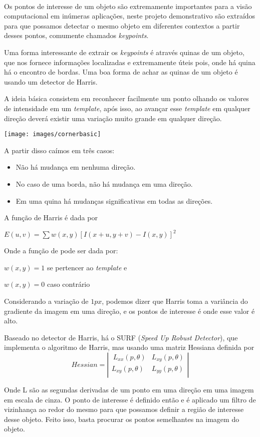 \documentclass[conference,harvard,brazil,english]{sbatex}
\begin{document}
	\paragraph{} Os pontos de interesse de um objeto são extremamente importantes para a visão computacional em inúmeras aplicações, neste projeto demonstrativo são extraídos para que possamos detectar o mesmo objeto em diferentes contextos a partir desses pontos, comumente chamados \textit{keypoints}.
	\par Uma forma interessante de extrair os \textit{keypoints} é através quinas de um objeto, que nos fornece informações localizadas e extremamente úteis pois, onde há quina há o encontro de bordas. Uma boa forma de achar as quinas de um objeto é usando um detector de Harris.
	\par A ideia básica consistem em reconhecer facilmente um ponto olhando os valores de intensidade em um \textit{template}, após isso, ao avançar esse \textit{template} em qualquer direção deverá existir uma variação muito grande em qualquer direção.\\
	\centerline{\texttt{[image: images/cornerbasic]}}
	\par A partir disso caímos em três casos: 
	\begin{itemize}
		\item[\Checkmark] Não há mudança em nenhuma direção.
		\item[\Checkmark] No caso de uma borda, não há mudança em uma direção.
		\item[\Checkmark] Em uma quina há mudanças significativas em todas as direções.
	\end{itemize}
	\par A função de Harris é dada por\\ 
	\par\centerline{$E(u,v) = \sum w(x,y)[I(x+u, y+v) - I(x,y)]^2$}
	Onde a função de pode ser dada por:\\
	\par
	\centerline{$w(x,y) = 1$  se pertencer ao \textit{template} e}
	\centerline{$w(x, y) = 0$ caso contrário}
	\par Considerando a variação de $1px$, podemos dizer que Harris toma a variância do gradiente da imagem em uma direção, e os pontos de interesse é onde esse valor é alto.
	\par Baseado no detector de Harris, há o SURF (\textit{Speed Up Robust Detector}), que implementa o algoritmo de Harris, mas usando uma matriz Hessiana definida por
	\[ Hessian = \left| \begin{array}{ccc}
	\ L_{xx}(p, \theta) & L_{xy}(p, \theta)\\
	L_{xy}(p, \theta) & L_{yy}(p, \theta)  \\
	\end{array}\right|\]
	\par Onde L são as segundas derivadas de um ponto em uma direção em uma imagem em escala de cinza.
	O ponto de interesse é definido então e é aplicado um filtro de vizinhança ao redor do mesmo para que possamos definir a região de interesse desse objeto. Feito isso, basta procurar os pontos semelhantes na imagem do objeto.
\end{document}
